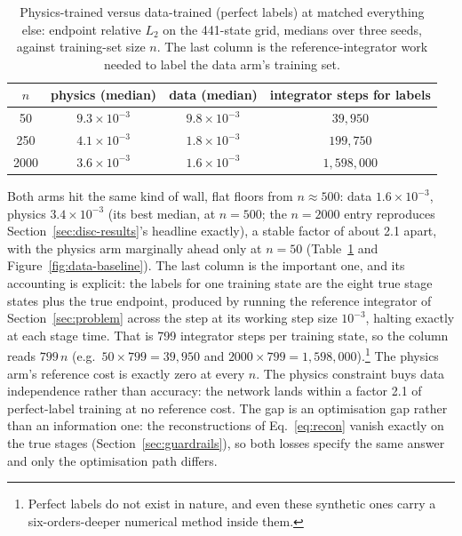 \documentclass[11pt,a4paper]{article}
\begin{document}
\begin{table}[tbp]
  \centering
  \caption{Physics-trained versus data-trained (perfect labels) at matched
  everything else: endpoint relative $L_2$ on the 441-state grid, medians
  over three seeds, against training-set size $n$. The last column is the
  reference-integrator work needed to label the data arm's training set.}
  \label{tab:baseline}
  \small
  \begin{tabular}{cccc}
    \toprule
    $n$ & physics (median) & data (median) & integrator steps for labels \\
    \midrule
    50   & $9.3\times10^{-3}$ & $9.8\times10^{-3}$ & $39{,}950$ \\
    250  & $4.1\times10^{-3}$ & $1.8\times10^{-3}$ & $199{,}750$ \\
    2000 & $3.6\times10^{-3}$ & $1.6\times10^{-3}$ & $1{,}598{,}000$ \\
    \bottomrule
  \end{tabular}
\end{table}

Both arms hit the same kind of wall, flat floors from $n \approx 500$:
data $1.6\times10^{-3}$, physics $3.4\times10^{-3}$ (its best median, at
$n = 500$; the $n = 2000$ entry reproduces
Section~\ref{sec:disc-results}'s headline exactly), a stable factor of
about 2.1 apart, with the physics arm marginally ahead only at $n = 50$
(Table~\ref{tab:baseline} and Figure~\ref{fig:data-baseline}). The last
column is the important one, and its accounting is explicit: the labels
for one training state are the eight true stage states plus the true
endpoint, produced by running the reference integrator of
Section~\ref{sec:problem} across the step at its working step size
$10^{-3}$, halting exactly at each stage time. That is 799 integrator
steps per training state, so the column reads $799\,n$ (e.g.\
$50 \times 799 = 39{,}950$ and
$2000 \times 799 = 1{,}598{,}000$).\footnote{Perfect labels do not exist
in nature, and even these synthetic ones carry a six-orders-deeper
numerical method inside them.} The physics arm's reference cost is exactly
zero at every $n$. The physics constraint buys data independence rather
than accuracy: the network lands within a factor 2.1 of perfect-label
training at no reference cost. The gap is an optimisation gap rather than
an information one: the reconstructions of Eq.~\eqref{eq:recon} vanish
exactly on the true stages (Section~\ref{sec:guardrails}), so both losses
specify the same answer and only the optimisation path differs.
\end{document}
